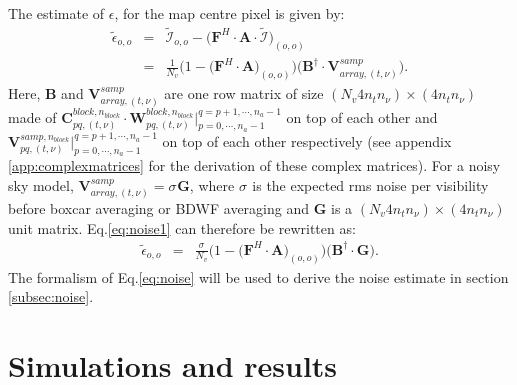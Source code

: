 \documentclass[useAMS,usenatbib]{mn2e}
\begin{document}
The estimate of  $\epsilon$, for the map centre pixel is given by:
\begin{eqnarray}
 \widetilde{\epsilon}_{o,o}&=&\widetilde{\mathcal{I}}_{o,o} - 
\Big(\mathbf{F}^{H}\cdot\mathbf{A}\cdot\widetilde{\mathcal{I}}\Big)_{(o,o)}\\							
&=&\frac{1}{N_{v}}\bigg(1-\Big(\mathbf{F}^{H}\cdot\mathbf{A}\Big)_{(o,o)}\bigg)\bigg(\mathbf{B}^{\dagger}\cdot\mathbf{V}_{array,(t,
\nu)}^{ samp } \bigg)\label{eq:noise1}.
\end{eqnarray}
Here, $\mathbf{B}$ and $\mathbf{V}_{array,(t,\nu)}^{samp}$ are  one row matrix of size $(N_v 4 n_t n_{\nu})\times (4 n_t n_{\nu})$ made of 
$\mathbf{C}_{pq,(t,\nu)}^{block,n_{block}}\cdot \mathbf{W}_{pq,(t,\nu)}^{block,n_{block}}\Big|_{p=0,\cdots,n_{a}-1}^{q=p+1,\cdots,n_{a}-1}$ 
on 
top of each other and $\mathbf{V}_{pq,(t,\nu)}^{samp,n_{block}}\Big|_{p=0,\cdots,n_{a}-1}^{q=p+1,\cdots,n_{a}-1}$ on top of each other 
respectively (see appendix \ref{app:complexmatrices} for the derivation of these complex matrices). For a noisy sky model, 
$\mathbf{V}_{array,(t, \nu)}^{ samp } =\sigma_{}\mathbf{G}$, 
where $\sigma_{}$ is the expected rms noise per visibility before boxcar averaging or BDWF averaging and $\mathbf{G}$ is a $(N_v 4 n_t 
n_{\nu}) \times (4 n_t n_{\nu})$ unit matrix. Eq.\ref{eq:noise1} can therefore be rewritten as:
\begin{eqnarray}
 \widetilde{\epsilon}_{o,o}		
&=&\frac{\sigma_{}}{N_{v}}\bigg(1-\Big(\mathbf{F}^{H}\cdot\mathbf{A}\Big)_{(o,o)}\bigg)\bigg(\mathbf{B}^{\dagger}\cdot\mathbf{G}
\bigg).\label{eq:noise}
\end{eqnarray}
The formalism of Eq.\ref{eq:noise} will be used to derive the noise estimate in section \ref{subsec:noise}.




\section{Simulations and results}
\end{document}

